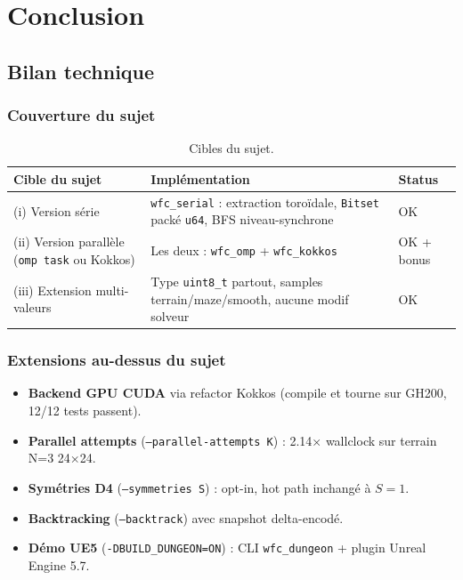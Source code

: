 \chapter{Conclusion}
\label{chap:conclusion}

\section{Bilan technique}
\label{sec:concl:bilan}

\subsection{Couverture du sujet}

\begin{table}[H]
\centering
\begin{tabularx}{\textwidth}{lXl}
\toprule
\textbf{Cible du sujet} & \textbf{Implémentation} & \textbf{Status} \\
\midrule
(i) Version série & \texttt{wfc\_serial} : extraction toroïdale, \texttt{Bitset} packé \texttt{u64}, BFS niveau-synchrone & OK \\
(ii) Version parallèle (\texttt{omp task} ou Kokkos) & Les deux : \texttt{wfc\_omp} + \texttt{wfc\_kokkos} & OK + bonus \\
(iii) Extension multi-valeurs & Type \texttt{uint8\_t} partout, samples terrain/maze/smooth, aucune modif solveur & OK \\
\bottomrule
\end{tabularx}
\caption{Cibles du sujet.}
\label{tab:concl:livrables}
\end{table}

\subsection{Extensions au-dessus du sujet}

\begin{itemize}
    \item \textbf{Backend GPU CUDA} via refactor Kokkos (compile et tourne sur GH200, 12/12 tests passent).
    \item \textbf{Parallel attempts} (\texttt{--parallel-attempts K}) : 2.14× wallclock sur terrain N=3 24×24.
    \item \textbf{Symétries D4} (\texttt{--symmetries S}) : opt-in, hot path inchangé à $S=1$.
    \item \textbf{Backtracking} (\texttt{--backtrack}) avec snapshot delta-encodé.
    \item \textbf{Démo UE5} (\texttt{-DBUILD\_DUNGEON=ON}) : CLI \texttt{wfc\_dungeon} + plugin Unreal Engine 5.7.
\end{itemize}

